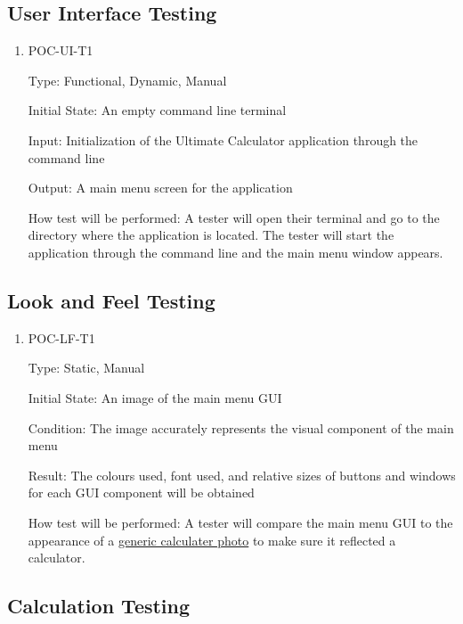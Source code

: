 \documentclass[12pt, titlepage]{article}
\begin{document}
\subsection{User Interface Testing}


\begin{enumerate}

\item{POC-UI-T1\\}

Type: Functional, Dynamic, Manual
					
Initial State: An empty command line terminal
					
Input: Initialization of the Ultimate Calculator application through the command line
					
Output: A main menu screen for the application
					
How test will be performed: A tester will open their terminal and go to the directory where the application is located. The tester will start the application through the command line and the main menu window appears.

\end{enumerate}

\subsection{Look and Feel Testing}


\begin{enumerate}

\item{POC-LF-T1\\}

Type: Static, Manual
					
Initial State: An image of the main menu GUI
					
Condition: The image accurately represents the visual component of the main menu
					
Result: The colours used, font used, and relative sizes of buttons and windows for each GUI component will be obtained
					
How test will be performed: A tester will compare the main menu GUI to the appearance of a \hyperref[calc]{generic calculater photo} to make sure it reflected a calculator.

\end{enumerate}

\subsection{Calculation Testing}
\end{document}

